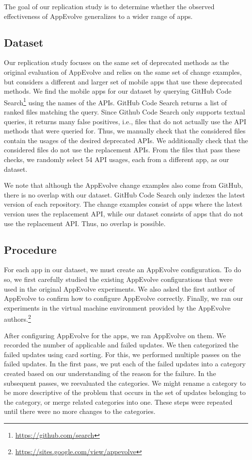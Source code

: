 The goal of our replication study is to determine whether the observed
effectiveness of AppEvolve generalizes to a wider range of apps.

\subsection{Dataset}
Our replication study focuses on the same set of deprecated methods as the
original evaluation of AppEvolve and relies on the same set of change
examples, but considers a different and larger set of mobile apps that use
these deprecated methods.  We find the mobile apps for our dataset by
querying GitHub Code Search\footnote{\url{https://github.com/search}} using
the names of the APIs. GitHub Code Search returns a list of ranked files
matching the query. Since Github Code Search only supports textual queries,
it returns many false positives, i.e., files that do not actually use the
API methods that were queried for.  Thus, we manually check that the
considered files contain the usages of the desired deprecated APIs.  We
additionally check that the considered files do not use the replacement
APIs. From the files that pass these checks, we randomly select 54 API
usages, each from a different app, as our dataset.

We note that although the AppEvolve change examples also come from GitHub,
there is no overlap with our dataset.  GitHub Code Search only indexes the
latest version of each repository.  The change examples consist of apps
where the latest version uses the replacement API, while our dataset
consists of apps that do not use the replacement API.  Thus, no overlap is
possible.

\subsection{Procedure}
For each app in our dataset, we must create an AppEvolve configuration. To
do so, we first carefully studied the existing AppEvolve configurations
that were used in the original AppEvolve experiments. We also asked the
first author of AppEvolve to confirm how to configure AppEvolve
correctly. Finally, we ran our experiments in the virtual machine
environment provided by the AppEvolve
authors.\footnote{\url{https://sites.google.com/view/appevolve}}

After configuring AppEvolve for the apps, we ran AppEvolve on them. We
recorded the number of applicable and failed updates. We then categorized
the failed updates using card sorting\cite{...}. For this, we performed
multiple passes on the failed updates. In the first pass, we put each
of the failed updates into a category created based on our understanding of
the reason for the failure. In the subsequent passes, we reevaluated the
categories. We might rename a category to be more descriptive of the
problem that occurs in the set of updates belonging to the category, or
merge related categories into one. These steps were repeated until there
were no more changes to the categories.
